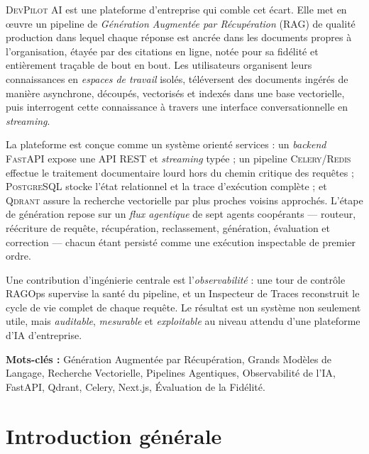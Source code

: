 \documentclass[12pt,a4paper,oneside]{report}
\newcommand{\devpilot}{\textsc{DevPilot AI}}
\begin{document}
\devpilot{} est une plateforme d'entreprise qui comble cet écart. Elle met en
{\oe}uvre un pipeline de \emph{Génération Augmentée par Récupération} (RAG) de
qualité production dans lequel chaque réponse est ancrée dans les documents
propres à l'organisation, étayée par des citations en ligne, notée pour sa
fidélité et entièrement traçable de bout en bout. Les utilisateurs organisent
leurs connaissances en \emph{espaces de travail} isolés, téléversent des
documents ingérés de manière asynchrone, découpés, vectorisés et indexés dans
une base vectorielle, puis interrogent cette connaissance à travers une interface
conversationnelle en \emph{streaming}.

La plateforme est conçue comme un système orienté services : un \textit{backend}
\textsc{FastAPI} expose une API REST et \textit{streaming} typée ; un pipeline
\textsc{Celery}/\textsc{Redis} effectue le traitement documentaire lourd hors du
chemin critique des requêtes ; \textsc{PostgreSQL} stocke l'état relationnel et
la trace d'exécution complète ; et \textsc{Qdrant} assure la recherche vectorielle
par plus proches voisins approchés. L'étape de génération repose sur un
\emph{flux agentique} de sept agents coopérants — routeur, réécriture de requête,
récupération, reclassement, génération, évaluation et correction — chacun étant
persisté comme une exécution inspectable de premier ordre.

Une contribution d'ingénierie centrale est l'\emph{observabilité} : une tour de
contrôle RAGOps supervise la santé du pipeline, et un Inspecteur de Traces
reconstruit le cycle de vie complet de chaque requête. Le résultat est un système
non seulement utile, mais \emph{auditable}, \emph{mesurable} et \emph{exploitable}
au niveau attendu d'une plateforme d'IA d'entreprise.

\noindent\textbf{Mots-clés :} Génération Augmentée par Récupération, Grands
Modèles de Langage, Recherche Vectorielle, Pipelines Agentiques, Observabilité de
l'IA, FastAPI, Qdrant, Celery, Next.js, Évaluation de la Fidélité.

\tableofcontents
\listoffigures
\listoftables

\chapter*{Introduction générale}
\end{document}
